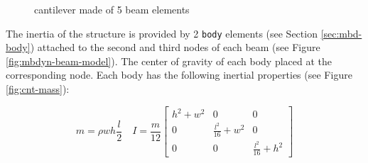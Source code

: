 \begin{figure}[htbp!]
	    \centering
    	\caption{cantilever made of 5 beam elements}
		\label{fig:cnt-beams}
\end{figure}

The inertia of the structure is provided by 2 \texttt{body} elements (see Section \ref{sec:mbd-body}) attached to the second and third nodes of each beam (see Figure \ref{fig:mbdyn-beam-model}). The center of gravity of each body placed at the corresponding node. Each body has the following inertial properties (see Figure \ref{fig:cnt-mass}): 

\begin{equation}
    m = \rho wh \frac{l}{2} \quad I = \frac{m}{12} \begin{bmatrix} h^2+w^2 & 0 & 0 \\ 0 & \frac{l^2}{16} + w^2 & 0 \\ 0 & 0 & \frac{l^2}{16} + h^2 \end{bmatrix}
    \label{eq:body-inertia}
\end{equation}


